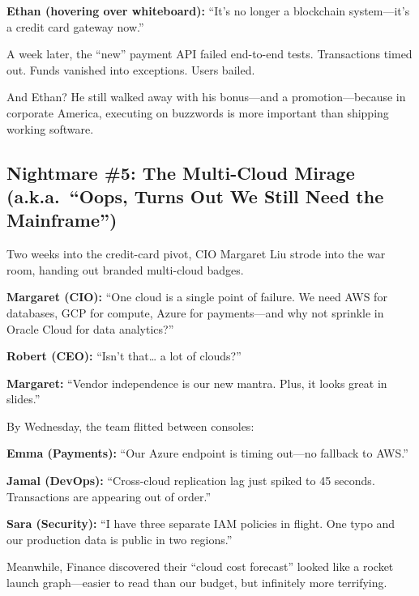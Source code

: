 \medskip

\textbf{Ethan (hovering over whiteboard):} “It’s no longer a blockchain system—it’s  
a credit card gateway now.”

\medskip

A week later, the “new” payment API failed end-to-end tests. Transactions  
timed out. Funds vanished into exceptions. Users bailed.

\medskip

And Ethan? He still walked away with his bonus—and a promotion—because in  
corporate America, executing on buzzwords is more important than shipping  
working software.  

\subsection{Nightmare \#5: The Multi-Cloud Mirage (a.k.a.\ “Oops, Turns Out We Still Need the Mainframe”)}

Two weeks into the credit-card pivot, CIO Margaret Liu strode into the war room,  
handing out branded multi-cloud badges.

\medskip

\textbf{Margaret (CIO):} “One cloud is a single point of failure. We need AWS for  
databases, GCP for compute, Azure for payments—and why not sprinkle in Oracle  
Cloud for data analytics?”

\medskip

\textbf{Robert (CEO):} “Isn’t that… a lot of clouds?”

\medskip

\textbf{Margaret:} “Vendor independence is our new mantra. Plus, it looks great in slides.”

\medskip

By Wednesday, the team flitted between consoles:

\medskip

\textbf{Emma (Payments):} “Our Azure endpoint is timing out—no fallback to AWS.”

\medskip

\textbf{Jamal (DevOps):} “Cross-cloud replication lag just spiked to 45 seconds.  
Transactions are appearing out of order.”

\medskip

\textbf{Sara (Security):} “I have three separate IAM policies in flight. One typo  
and our production data is public in two regions.”

\medskip

Meanwhile, Finance discovered their “cloud cost forecast” looked like a rocket  
launch graph—easier to read than our budget, but infinitely more terrifying.


